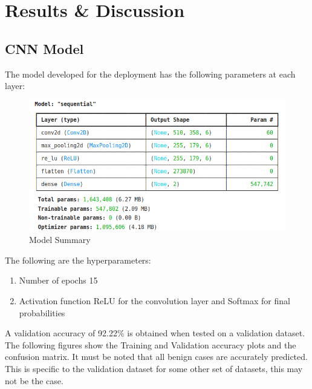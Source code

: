 \newpage
\chapter{Results \& Discussion}

    \section{CNN Model}
    \noindent
    The model developed for the deployment has the following parameters at each layer:
    \begin{figure}[H]
        \centering
        \includegraphics[width=1\linewidth]{images/modelSummary.png}
        \caption{Model Summary}
        \label{fig:enter-label}
    \end{figure}
    The following are the hyperparameters:
    \begin{enumerate}
        \item Number of epochs 15
        \item Activation function ReLU for the convolution layer and Softmax for final probabilities
    \end{enumerate}

    \noindent
    A validation accuracy of 92.22\% is obtained when tested on a validation dataset. The following figures show the Training and Validation accuracy plots and the confusion matrix. It must be noted that all benign cases are accurately predicted. This is specific to the validation dataset for some other set of datasets, this may not be the case.

